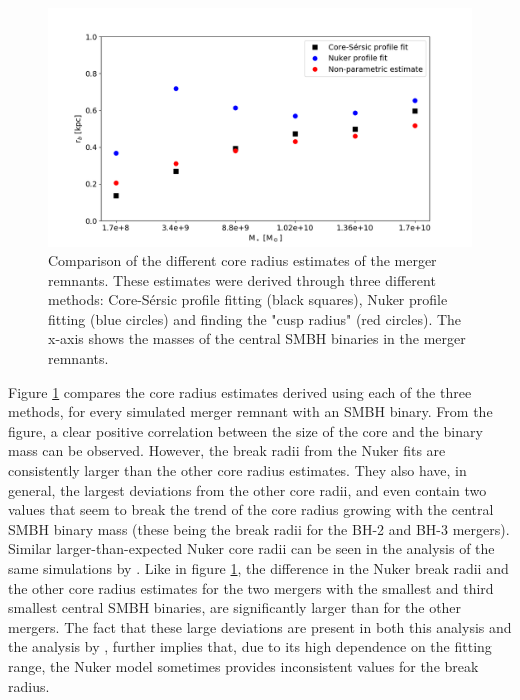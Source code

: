 \documentclass[english, twoside]{HYgradu}
\begin{document}
\begin{figure}
	\centering
	\includegraphics[width=\textwidth]{rb_mass_relation.png}
	\caption{Comparison of the different core radius estimates of the merger remnants. These estimates were derived through three different methods: Core-Sérsic profile fitting (black squares), Nuker profile fitting (blue circles) and  finding the "cusp radius" (red circles). The x-axis shows the masses of the central SMBH binaries in the merger remnants.}
	\label{figure:radii_comparison}
\end{figure}

Figure \ref{figure:radii_comparison} compares the core radius estimates derived using each of the three methods, for every simulated merger remnant with an SMBH binary. From the figure, a clear positive correlation between the size of the core and the binary mass can be observed. However, the break radii from the Nuker fits are consistently larger than the other core radius estimates. They also have, in general, the largest deviations from the other core radii, and even contain two values that seem to break the trend of the core radius growing with the central SMBH binary mass (these being the break radii for the BH-2 and BH-3 mergers). Similar larger-than-expected Nuker core radii can be seen in the analysis of the same simulations by \cite{Rantala2018}. Like in figure \ref{figure:radii_comparison}, the difference in the Nuker break radii and the other core radius estimates for the two mergers with the smallest and third smallest central SMBH binaries, are significantly larger than for the other mergers. The fact that these large deviations are present in both this analysis and the analysis by \cite{Rantala2018}, further implies that, due to its high dependence on the fitting range, the Nuker model sometimes provides inconsistent values for the break radius.
\end{document}
